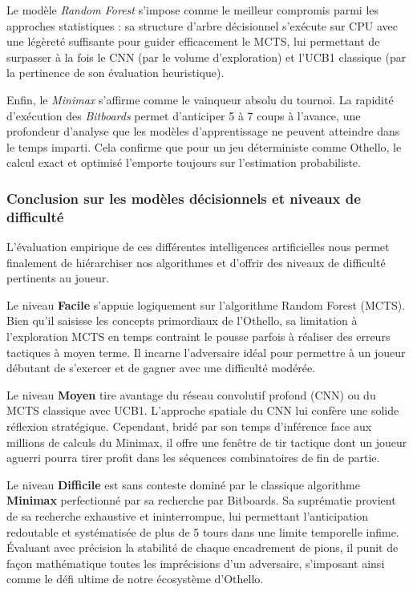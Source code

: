 \documentclass[a4paper]{article}
\begin{document}
Le modèle \textit{Random Forest} s'impose comme le meilleur compromis parmi les approches statistiques : sa structure d'arbre décisionnel s'exécute sur CPU avec une légèreté suffisante pour guider efficacement le MCTS, lui permettant de surpasser à la fois le CNN (par le volume d'exploration) et l'UCB1 classique (par la pertinence de son évaluation heuristique).

Enfin, le \textit{Minimax} s'affirme comme le vainqueur absolu du tournoi. La rapidité d'exécution des \textit{Bitboards} permet d'anticiper 5 à 7 coups à l'avance, une profondeur d'analyse que les modèles d'apprentissage ne peuvent atteindre dans le temps imparti. Cela confirme que pour un jeu déterministe comme Othello, le calcul exact et optimisé l'emporte toujours sur l'estimation probabiliste.

\subsubsection{Conclusion sur les modèles décisionnels et niveaux de difficulté}

L'évaluation empirique de ces différentes intelligences artificielles nous permet finalement de hiérarchiser nos algorithmes et d'offrir des niveaux de difficulté pertinents au joueur.

Le niveau \textbf{Facile} s'appuie logiquement sur l'algorithme Random Forest (MCTS). Bien qu'il saisisse les concepts primordiaux de l'Othello, sa limitation à l'exploration MCTS en temps contraint le pousse parfois à réaliser des erreurs tactiques à moyen terme. Il incarne l'adversaire idéal pour permettre à un joueur débutant de s'exercer et de gagner avec une difficulté modérée.

Le niveau \textbf{Moyen} tire avantage du réseau convolutif profond (CNN) ou du MCTS classique avec UCB1. L'approche spatiale du CNN lui confère une solide réflexion stratégique. Cependant, bridé par son temps d'inférence face aux millions de calculs du Minimax, il offre une fenêtre de tir tactique dont un joueur aguerri pourra tirer profit dans les séquences combinatoires de fin de partie.

Le niveau \textbf{Difficile} est sans conteste dominé par le classique algorithme \textbf{Minimax} perfectionné par sa recherche par Bitboards. Sa suprématie provient de sa recherche exhaustive et ininterrompue, lui permettant l'anticipation redoutable et systématisée de plus de 5 tours dans une limite temporelle infime. Évaluant avec précision la stabilité de chaque encadrement de pions, il punit de façon mathématique toutes les imprécisions d'un adversaire, s'imposant ainsi comme le défi ultime de notre écosystème d'Othello.
\end{document}
